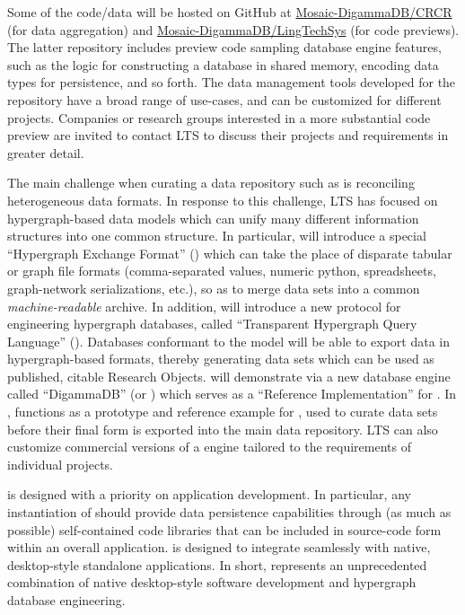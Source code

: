 \documentclass[11pt,letterpaper]{article}
\newcommand{\ATextCClr}[1]{\textcolor{atcColor}{\textbf{#1}}}
\newcommand{\HGXF}{{\resizebox{!}{7.5pt}{\ATextCClr{HGXF}}}}
\newcommand{\CRtwo}{{\resizebox{!}{7.5pt}{\ATextCClr{CR2}}}}
\newcommand{\lCRtwo}{{\resizebox{!}{8pt}{\ATextCClr{CR2}}}}
\newcommand{\THQL}{\resizebox{!}{7.5pt}{\ATextCClr{THQL}}}
\newcommand{\lTHQL}{\resizebox{!}{8pt}{\ATextCClr{THQL}}}
\newcommand{\ATextClr}[1]{\textcolor{atColor}{\textbf{#1}}}
\newcommand{\DgDb}{{\mathversion{fordg}%
\makebox{\raisebox{-3pt}{\resizebox{!}{11pt}{\ATextClr{%
\rotatebox{17}{$\varsigma$}}}}\hspace{-4pt}%
\resizebox{!}{6.5pt}{\ATextClr{D\hspace{-2pt}B}}}}}
\newcommand{\ATextClr}[1]{\textcolor{atColor}{\textbf{#1}}}
\newcommand{\DgDb}{\makebox{\raisebox{-3pt}{\resizebox{!}{11pt}{\ATextClr{%
\rotatebox{17}{$\varsigma$}}}}\hspace{-4pt}%
\resizebox{!}{6.5pt}{\ATextClr{D\hspace{-2pt}B}}}}
\newcommand{\p}[1]{

\vspace{1em}#1}
\newcommand{\q}[1]{{\fontfamily{qcr}\selectfont ``}#1{\fontfamily{qcr}\selectfont ''}}
\begin{document}
{\p{Some of the \CRtwo{} code/data will be hosted on 
GitHub at \href{https://github.com/Mosaic-DigammaDB/CRCR}{Mosaic-DigammaDB/CRCR} 
(for data aggregation) and 
\href{https://github.com/Mosaic-DigammaDB/CRCR}{Mosaic-DigammaDB/LingTechSys} 
(for code previews).  
The latter repository includes preview code sampling 
database engine features, such as the logic for constructing a 
database in shared memory, encoding data types for persistence, 
and so forth.  
The data management tools developed 
for the \CRtwo{} repository have a broad range of use-cases, and 
can be customized for different projects.  
Companies or research groups interested in a more 
substantial code preview are invited to contact LTS
to discuss their projects and requirements in greater detail.}

\p{The main challenge when curating a 
data repository such as \CRtwo{} is reconciling 
heterogeneous data formats.  
In response to this challenge, LTS has 
focused on hypergraph-based data models 
which can unify many different information 
structures into one common structure.  
In particular, \CRtwo{} will introduce 
a special \q{Hypergraph Exchange Format} (\HGXF{}) 
which can take the place of disparate 
tabular or graph file formats 
(comma-separated values, numeric python, 
spreadsheets, graph-network serializations, 
etc.), so as to merge data sets into a common 
\textit{machine-readable} archive.  In addition, \CRtwo{} will 
introduce a new protocol for engineering 
hypergraph databases, called 
\q{Transparent Hypergraph Query Language}
(\THQL{}).  Databases conformant to the \THQL{} model will 
be able to export data in hypergraph-based 
formats, thereby generating data sets 
which can be used as published, citable 
Research Objects.  \lCRtwo{} will demonstrate 
\THQL{} via a new database engine called \q{DigammaDB} 
(or \DgDb{}) which 
serves as a \q{Reference Implementation} for 
\THQL{}.  In \CRtwo{}, \DgDb{} functions as 
a prototype and reference example for \THQL{}, used 
to curate data sets before their final 
form is exported into the main data repository.  
LTS can also customize commercial versions of a \THQL{} 
engine tailored to the requirements of 
individual projects.} 
    
\p{\lTHQL{} is designed with a priority on 
application development.  In particular, 
any instantiation of \THQL{} should 
provide data persistence capabilities 
through (as much as possible) self-contained 
code libraries that can be included in 
source-code form within an overall application.  
\lTHQL{} is designed to integrate seamlessly 
with native, desktop-style standalone 
applications.  In short, \THQL{} 
represents an unprecedented combination of 
native desktop-style software development 
and hypergraph database engineering.} 

}
\end{document}
